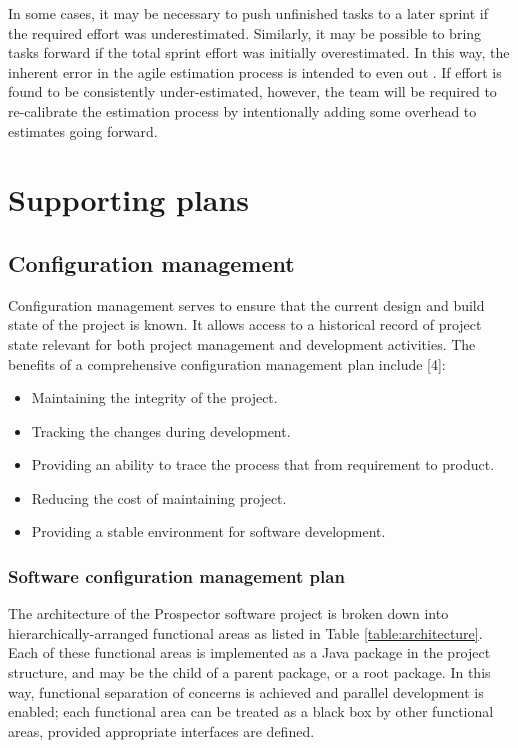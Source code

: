 \documentclass[12pt]{article}
\begin{document}
In some cases, it may be necessary to push unfinished tasks to a later sprint if the required effort was underestimated. Similarly, it may be possible to bring tasks forward if the total sprint effort was initially overestimated. In this way, the inherent error in the agile estimation process is intended to even out \cite{sommerville}. If effort is found to be consistently under-estimated, however, the team will be required to re-calibrate the estimation process by intentionally adding some overhead to estimates going forward.

\section{Supporting plans}\label{funcrec}
\subsection{Configuration management}
Configuration management serves to ensure that the current design and build state of the project is known. It allows access to a historical record of project state relevant for  both project management and development activities. The benefits of a comprehensive configuration management plan include [4]:
\begin{itemize}
\item Maintaining the integrity of the project.
\item Tracking the changes during development.
\item Providing an ability to trace the process that from requirement to product.
\item Reducing the cost of maintaining project.
\item Providing a stable environment for software development.
\end{itemize}

\subsubsection{Software configuration management plan}

The architecture of the Prospector software project is broken down into hierarchically-arranged functional areas as listed in Table \ref{table:architecture}. Each of these functional areas is implemented as a Java package in the project structure, and may be the child of a parent package, or a root package. In this way, functional separation of concerns is achieved and parallel development is enabled; each functional area can be treated as a black box by other functional areas, provided appropriate interfaces are defined.
\end{document}
